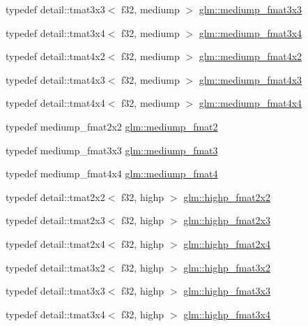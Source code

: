 \begin{CompactItemize}
\item 
typedef detail::tmat3x3$<$ f32, mediump $>$ \hyperlink{group__gtc__type__precision_ga7f015dd5b962a658178bb881d4620cc}{glm::mediump\_\-fmat3x3}
\item 
typedef detail::tmat3x4$<$ f32, mediump $>$ \hyperlink{group__gtc__type__precision_gfa5aaa948365f349840dfeb9eeebf0cd}{glm::mediump\_\-fmat3x4}
\item 
typedef detail::tmat4x2$<$ f32, mediump $>$ \hyperlink{group__gtc__type__precision_g09a2851d38fe3cf52735a1d26199bdcc}{glm::mediump\_\-fmat4x2}
\item 
typedef detail::tmat4x3$<$ f32, mediump $>$ \hyperlink{group__gtc__type__precision_g5e5de428d1e1da2c593a6245d92dd8c0}{glm::mediump\_\-fmat4x3}
\item 
typedef detail::tmat4x4$<$ f32, mediump $>$ \hyperlink{group__gtc__type__precision_g7f4ae9d05ca94005a0b7d8e3c59943cd}{glm::mediump\_\-fmat4x4}
\item 
typedef mediump\_\-fmat2x2 \hyperlink{group__gtc__type__precision_g5b9de77ef7403ffc972700219eca5450}{glm::mediump\_\-fmat2}
\item 
typedef mediump\_\-fmat3x3 \hyperlink{group__gtc__type__precision_g85f2267401434ea8c5463af040f0760c}{glm::mediump\_\-fmat3}
\item 
typedef mediump\_\-fmat4x4 \hyperlink{group__gtc__type__precision_g6cd3ae1f3509b79061edcc83564769d4}{glm::mediump\_\-fmat4}
\item 
typedef detail::tmat2x2$<$ f32, highp $>$ \hyperlink{group__gtc__type__precision_geb76f1230ecfd4c80635d3c618405e31}{glm::highp\_\-fmat2x2}
\item 
typedef detail::tmat2x3$<$ f32, highp $>$ \hyperlink{group__gtc__type__precision_g53c126d1650b460bc7496a6fd5e5e764}{glm::highp\_\-fmat2x3}
\item 
typedef detail::tmat2x4$<$ f32, highp $>$ \hyperlink{group__gtc__type__precision_g5df8430c47272adc901ef224d85a9c4d}{glm::highp\_\-fmat2x4}
\item 
typedef detail::tmat3x2$<$ f32, highp $>$ \hyperlink{group__gtc__type__precision_gd5c083691eb15539fd81e27e1dc6b813}{glm::highp\_\-fmat3x2}
\item 
typedef detail::tmat3x3$<$ f32, highp $>$ \hyperlink{group__gtc__type__precision_gf1d697243b1de74a5769c49e68b1e2a6}{glm::highp\_\-fmat3x3}
\item 
typedef detail::tmat3x4$<$ f32, highp $>$ \hyperlink{group__gtc__type__precision_g1f377a3da21dd6c418ec3a5119a4514a}{glm::highp\_\-fmat3x4}
\item 

\end{CompactItemize}
